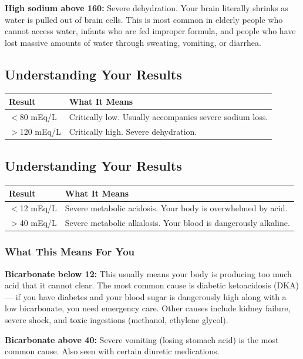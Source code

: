 \textbf{High sodium above 160:} Severe dehydration. Your brain literally shrinks as water is pulled out of brain cells. This is most common in elderly people who cannot access water, infants who are fed improper formula, and people who have lost massive amounts of water through sweating, vomiting, or diarrhea.

\subsection{Understanding Your Results}

\begin{longtable}{@{}ll@{}}
\toprule
\textbf{Result} & \textbf{What It Means} \\
\midrule
$<$80 mEq/L & Critically low. Usually accompanies severe sodium loss. \\
$>$120 mEq/L & Critically high. Severe dehydration. \\
\bottomrule
\end{longtable}

\subsection{Understanding Your Results}

\begin{longtable}{@{}ll@{}}
\toprule
\textbf{Result} & \textbf{What It Means} \\
\midrule
$<$12 mEq/L & Severe metabolic acidosis. Your body is overwhelmed by acid. \\
$>$40 mEq/L & Severe metabolic alkalosis. Your blood is dangerously alkaline. \\
\bottomrule
\end{longtable}

\subsubsection{What This Means For You}

\textbf{Bicarbonate below 12:} This usually means your body is producing too much acid that it cannot clear. The most common cause is diabetic ketoacidosis (DKA) --- if you have diabetes and your blood sugar is dangerously high along with a low bicarbonate, you need emergency care. Other causes include kidney failure, severe shock, and toxic ingestions (methanol, ethylene glycol).

\textbf{Bicarbonate above 40:} Severe vomiting (losing stomach acid) is the most common cause. Also seen with certain diuretic medications.

